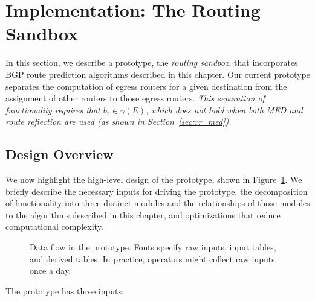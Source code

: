 \section{Implementation: The Routing Sandbox}
\label{sec:sandbox_implementation}

In this section, we describe a prototype, the {\em routing sandbox}, that
incorporates BGP route prediction algorithms described in this chapter.
Our current prototype separates the computation of egress routers for a
given destination from the assignment of other routers to those egress
routers.   {\em This separation of functionality requires that $b_r \in
\gamma(E)$, which does not hold when {\em both} MED and route reflection are
used (as shown in Section~\ref{sec:rr_med}).}  

\subsection{Design Overview}

We now highlight the high-level design of the prototype, shown in
Figure~\ref{fig:dataflow}.  We 
briefly describe the necessary inputs for driving the prototype, the
decomposition of functionality into three distinct modules and the
relationships of those modules to the algorithms described in this
chapter, and optimizations that reduce computational complexity.

\begin{figure}[h!]
\centering {}
\caption[Data flow in the prototype.]{Data flow in the prototype.  Fonts
  specify {\emc raw 
  inputs}, {\mfc input tables}, and {\dfc derived tables}.  In
  practice, operators might 
  collect raw inputs once a day.}
\label{fig:dataflow}
\end{figure}


The prototype has three inputs:

